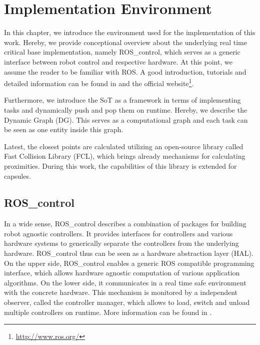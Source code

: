 \chapter{Implementation Environment}
\label{chapter:implenv}
In this chapter, we introduce the environment used for the implementation of this work. Hereby, we provide conceptional overview about the underlying real time critical base implementation, namely ROS\_control, which serves as a generic interface between robot control and respective hardware. At this point, we assume the reader to be familiar with ROS. A good introduction, tutorials and detailed information can be found in \cite{martinez2013learning} and the official website\footnote{\url{http://www.ros.org/}}.

Furthermore, we introduce the SoT as a framework in terms of implementing tasks and dynamically push and pop them on runtime. Hereby, we describe the Dynamic Graph (DG). This serves as a computational graph and each task can be seen as one entity inside this graph.

Latest, the closest points are calculated utilizing an open-source library called Fast Collision Library (FCL), which brings already mechanisms for calculating proximities. During this work, the capabilities of this library is extended for capsules. 

\section{ROS\_control}\label{sec:roscontrol}
In a wide sense, ROS\_control describes a combination of packages for building robot agnostic controllers. It provides interfaces for controllers and various hardware systems to generically separate the controllers from the underlying hardware. ROS\_control thus can be seen as a hardware abstraction layer (HAL). On the upper side, ROS\_control enables a generic ROS compatible programming interface, which allows hardware agnostic computation of various application algorithms. On the lower side, it communicates in a real time safe environment with the concrete hardware. This mechanism is monitored by a independent observer, called the controller manager, which allows to load, switch and unload multiple controllers on runtime. More information can be found in \cite{roscontrol}.

